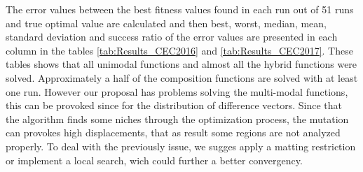 \begin{table}[t]
\centering
\caption{Summary results - CEC 2017}
\label{tab:Summary_CEC2017}
\end{table}

The error values between the best fitness values found in each run out of 51 runs and true optimal value are calculated and then best, worst, median, mean, standard deviation and success ratio of the error values are presented in each column in the tables \ref{tab:Results_CEC2016} and \ref{tab:Results_CEC2017}.
%
These tables shows that all unimodal functions and almost all the hybrid functions were solved.
%
Approximately a half of the composition functions are solved with at least one run.
%
However our proposal has problems solving the multi-modal functions, this can be provoked since for the distribution of difference vectors.
%
Since that the algorithm finds some niches through the optimization process, the mutation can provokes high displacements, that as result some regions are not analyzed properly.
%
To deal with the previously issue, we sugges apply a matting restriction or implement a local search, wich could further a better convergency.

